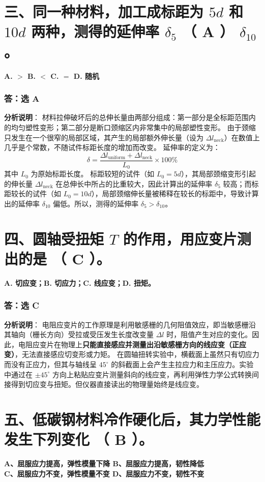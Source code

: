 \documentclass[11pt,a4paper]{ctexrep}
\begin{document}
{\section*{三、同一种材料，加工成标距为 $5d$ 和 $10d$ 两种，测得的延伸率 $\delta_5$ （ A ） $\delta_{10}$。}
\textbf{A. $>$ \qquad B. $<$ \qquad C. $=$ \qquad D. 随机}

\subsubsection*{答：选 A}
\textbf{分析说明}：
材料拉伸破坏后的总伸长量由两部分组成：第一部分是全标距范围内的均匀塑性变形；第二部分是断口颈缩区内非常集中的局部塑性变形。
由于颈缩只发生在一个很窄的局部区域，其产生的局部额外伸长量（设为 $\Delta l_{\text{neck}}$）在数值上几乎是个常数，不随试件标距长度的增加而改变。
延伸率的定义为：
\[
    \delta = \frac{\Delta l_{\text{uniform}} + \Delta l_{\text{neck}}}{L_0} \times 100\%
\]
其中 $L_0$ 为原始标距长度。
标距较短的试件（如 $L_0 = 5d$），其局部颈缩变形引起的伸长量 $\Delta l_{\text{neck}}$ 在总伸长中所占的比重较大，因此计算出的延伸率 $\delta_5$ 较高；而标距较长的试件（如 $L_0 = 10d$），局部颈缩伸长量被稀释在较长的标距中，导致计算出的延伸率 $\delta_{10}$ 偏低。所以，测得的延伸率 $\delta_5 > \delta_{10}$。

\section*{四、圆轴受扭矩 $T$ 的作用，用应变片测出的是 （ C ）。}
\textbf{A. 切应变；\qquad B. 切应力；\qquad C. 线应变；\qquad D. 扭矩。}

\subsubsection*{答：选 C}
\textbf{分析说明}：
电阻应变片的工作原理是利用敏感栅的几何阻值效应，即当敏感栅沿其轴向（栅长方向）受拉或受压发生长度改变量 $\Delta l$ 时，阻值产生对应的变化。因此，电阻应变片在物理上\textbf{只能直接感应并测量出沿敏感栅方向的线应变（正应变）}，无法直接感应切变形或力矩。
在圆轴扭转实验中，横截面上虽然只有切应力而没有正应力，但其与轴线呈 $45^\circ$ 的斜截面上会产生主拉应力和主压应力。实验中通过在 $\pm 45^\circ$ 方向上粘贴应变片测量斜向的线应变，再利用弹性力学公式转换间接得到切应变与扭矩。但仪器直接读出的物理量始终是线应变。

\section*{五、低碳钢材料冷作硬化后，其力学性能发生下列变化 （ B ）。}
\textbf{A、屈服应力提高，弹性模量下降 \qquad B、屈服应力提高，韧性降低 \\
C、屈服应力不变，弹性模量不变 \qquad D、屈服应力不变，韧性不变}

}
\end{document}
